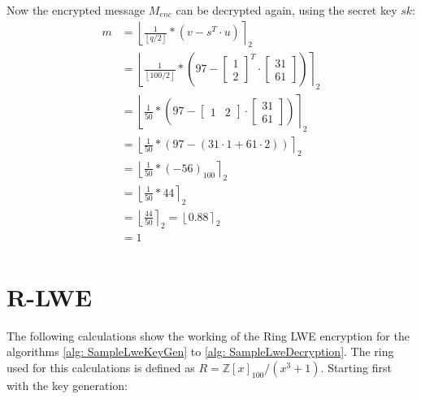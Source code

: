 Now the encrypted message $M_{enc}$ can be decrypted again, using the secret key $sk$:
\begin{align*}
  m & = \left\lfloor \frac{1}{\left\lfloor q/2\right\rfloor} *(v-s^T \cdot u)\right\rceil _2 \\
    & = \left\lfloor \frac{1}{\left\lfloor 100/2\right\rfloor} * \left (97-
  \begin{bmatrix}
      1 \\
      2
    \end{bmatrix}^T
  \cdot
  \begin{bmatrix}
      31 \\
      61
    \end{bmatrix} \right )\right\rceil _2                                                      \\
    & = \left\lfloor \frac{1}{50} * \left (97-
  \begin{bmatrix}
      1 & 2 
    \end{bmatrix}
  \cdot 
  \begin{bmatrix}
      31 \\ 
      61
    \end{bmatrix}\right )\right\rceil _2                                                       \\
    & = \left\lfloor \frac{1}{50} * (97-(31 \cdot 1 + 61 \cdot 2))\right\rceil _2            \\
    & = \left\lfloor \frac{1}{50} * (-56)_{100}\right\rceil _2                               \\
    & = \left\lfloor \frac{1}{50} * 44\right\rceil _2                                        \\
    & = \left\lfloor \frac{44}{50}\right\rceil _2  = \left\lfloor 0.88\right\rceil _2        \\
    & = 1                                                                                    \\
\end{align*}

\section{R-LWE}
\label{app:RlweExampleCalc}
The following calculations show the working of the Ring LWE encryption for the algorithms \ref{alg: SampleLweKeyGen} to \ref{alg: SampleLweDecryption}. The ring used for this calculations is defined as $R=\mathbb{Z}[x]_{100}/(x^3+1)$. Starting first with the key generation:

